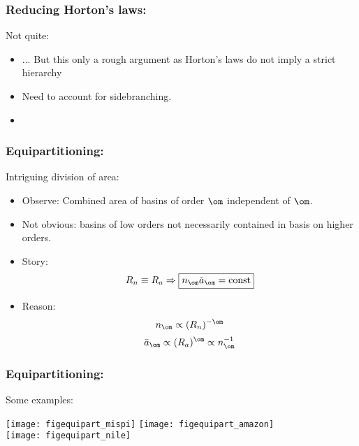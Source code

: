 \begin{frame}[label=]
  \frametitle{Reducing Horton's laws:}

  \begin{block}{Not quite:}
    \begin{itemize}
    \item<1-> ... But this only a rough argument
      as Horton's laws do not imply a strict hierarchy
    \item<2-> Need to account for sidebranching.
    \item<3-> 
    \end{itemize}
  \end{block}

\end{frame}

\begin{frame}[label=]
  \frametitle{Equipartitioning:}

  \begin{block}{Intriguing division of area:}
  \begin{itemize}
  \item<1->
    Observe: Combined area of basins of order $\om$ 
    independent of $\om$.
  \item<2->
    Not obvious: basins of low orders not necessarily contained
    in basis on higher orders.
  \item<3->
    Story: $$ {R_n \equiv R_a} 
    \Rightarrow \boxed{n_\om \bar{a}_\om = \mbox{const}} $$
  \item<4->
    Reason:
    $$ n_\om \propto (R_n)^{-\om} $$
    $$ \bar{a}_\om \propto (R_a)^{\om} \propto n_\om^{-1}$$
  \end{itemize}
  \end{block}

\end{frame}

\begin{frame}[label=]
  \frametitle{Equipartitioning:}
  \begin{block}{Some examples:}
    \begin{center}
      \texttt{[image: figequipart\_mispi]}
      \texttt{[image: figequipart\_amazon]} \\
      \texttt{[image: figequipart\_nile]}
    \end{center}
  \end{block}

\end{frame}


